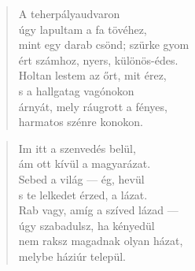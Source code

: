 
\vspace*{-15mm}
\centeredornament



\begin{verse}
  A teherpályaudvaron \\
  úgy lapultam a fa tövéhez, \\
  mint egy darab csönd; szürke gyom \\
  ért számhoz, nyers, különös-édes. \\
  Holtan lestem az őrt, mit érez, \\
  s a hallgatag vagónokon \\
  árnyát, mely ráugrott a fényes, \\
  harmatos szénre konokon.
\end{verse}

\bigskip



\begin{verse}
  Im itt a szenvedés belül, \\
  ám ott kívül a magyarázat. \\
  Sebed a világ --- ég, hevül \\
  s te lelkedet érzed, a lázat. \\
  Rab vagy, amíg a szíved lázad --- \\
  úgy szabadulsz, ha kényedül \\
  nem raksz magadnak olyan házat, \\
  melybe háziúr települ.
\end{verse}

\newpage


\vspace*{-15mm}
\centeredornament



